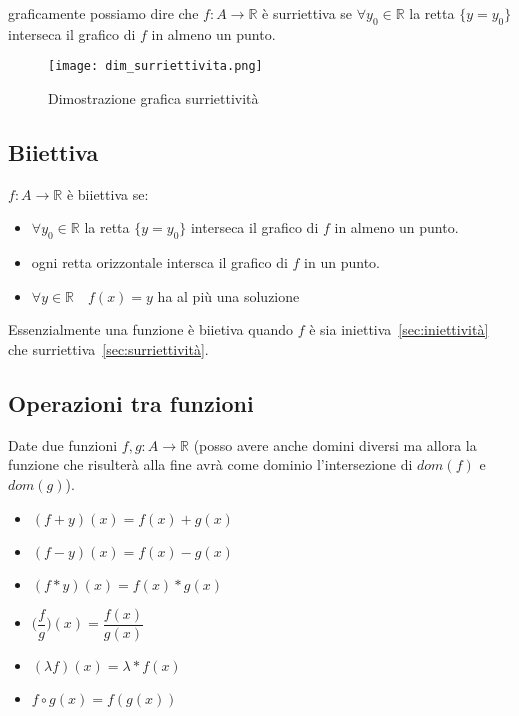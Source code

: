 \documentclass[../main.tex, class=article, 12pt]{subfiles}
\begin{document}
\begin{definition}
graficamente possiamo dire che $f : A \to \mathbb{R}$ è surriettiva se $ \forall y_0 \in \mathbb{R} $ la retta $ \{y = y_0\} $ interseca il grafico di $ f $ in almeno un punto.
\end{definition}

\begin{figure}[H]
  	\texttt{[image: dim\_surriettivita.png]}
  	\caption{Dimostrazione grafica surriettività}
        \label{fig:dim_surriettivita}
\end{figure}



\subsection{Biiettiva}\label{sec:biiettiva}
$ f : A \to \mathbb{R} $ è biiettiva se:
\begin{itemize}
        \item $ \forall y_0 \in \mathbb{R} $ la retta $ \{y = y_0\} $ interseca il grafico di $ f $ in almeno un punto.
        \item ogni retta orizzontale intersca il grafico di $ f $ in un punto. 
        \item $ \forall y \in \mathbb{R} \quad f(x) = y$ ha al più una soluzione
\end{itemize}
Essenzialmente una funzione è biietiva quando $ f $ è sia iniettiva~\ref{sec:iniettività} che surriettiva~\ref{sec:surriettività}.



\newpage
\subsection{Operazioni tra funzioni}\label{sec:operazioni_tra_funzioni}
Date  due funzioni $ f,g : A \to \mathbb{R} $
(posso avere anche domini diversi ma allora la funzione che risulterà alla fine avrà come dominio l'intersezione di $ dom(f) $ e $ dom(g) $).

\begin{itemize}
        \item $(f + y)(x) = f(x) + g(x)$
        \item $(f - y)(x) = f(x) - g(x)$
        \item $(f * y)(x) = f(x) * g(x)$
        \item $\Bigg(\dfrac{f}{g}\Bigg)(x) = \dfrac{f(x)}{g(x)}$
        \item $(\lambda f)(x) = \lambda * f(x)$
        \item $ f \circ g (x) = f(g(x))$
\end{itemize}
\end{document}
